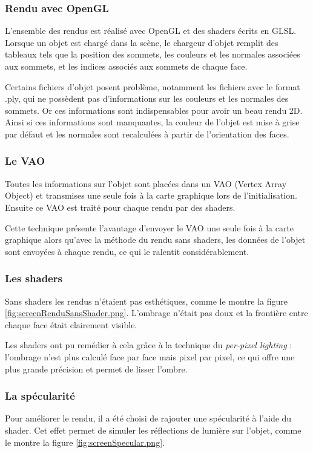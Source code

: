\subsubsection{Rendu avec OpenGL}
L'ensemble des rendus est réalisé avec OpenGL et des shaders écrits en GLSL. Lorsque un objet est chargé dans la scène, le chargeur d'objet remplit des tableaux tels que la position des sommets, les couleurs et les normales associées aux sommets, et les indices associés aux sommets de chaque face.

Certains fichiers d'objet posent problème, notamment les fichiers avec le format .ply, qui ne possèdent pas d'informations sur les couleurs et les normales des sommets. Or ces informations sont indispensables pour avoir un beau rendu 2D. Ainsi si ces informations sont manquantes, la couleur de l'objet est mise à grise par défaut et les normales sont recalculées à partir de l'orientation des faces.


\subsubsection{Le VAO}
Toutes les informations sur l'objet sont placées dans un VAO (Vertex Array Object) et transmises une seule fois à la carte graphique lors de l'initialisation. Ensuite ce VAO est traité pour chaque rendu par des shaders.

Cette technique présente l'avantage d'envoyer le VAO une seule fois à la carte graphique alors qu'avec la méthode du rendu sans shaders, les données de l'objet sont envoyées à chaque rendu, ce qui le ralentit considérablement.

\subsubsection{Les shaders}
Sans shaders les rendus n'étaient pas esthétiques, comme le montre la figure \ref{fig:screenRenduSansShader.png}. L'ombrage n'était pas doux et la frontière entre chaque face était clairement visible. 

Les shaders ont pu remédier à cela grâce à la technique du \textit{per-pixel lighting} : l'ombrage n'est plus calculé face par face mais pixel par pixel, ce qui offre une plus grande précision et permet de lisser l'ombre.

\subsubsection{La spécularité}
Pour améliorer le rendu, il a été choisi de rajouter une spécularité à l'aide du shader. Cet effet permet de simuler les réflections de lumière sur l'objet, comme le montre la figure \ref{fig:screenSpecular.png}.

